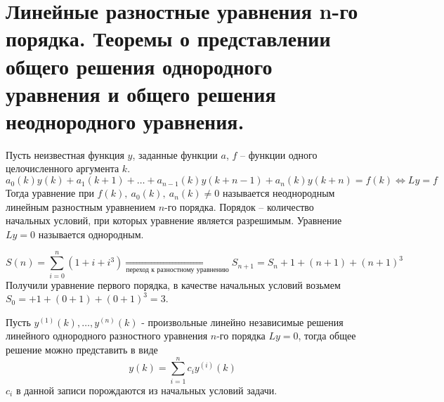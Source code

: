 \section{Линейные разностные уравнения n-го порядка.
  Теоремы о представлении общего решения однородного уравнения
  и общего решения неоднородного уравнения.
 }

\begin{definition}
  Пусть неизвестная функция $y$, заданные функции $a$, $f$
  -- функции одного целочисленного аргумента $k$.
  \[ a_0(k)y(k)+a_1(k+1)+\ldots+a_{n-1}(k)y(k+n-1)+a_n(k)y(k+n)=f(k) \Leftrightarrow Ly=f \]
  Тогда уравнение при $f(k),\ a_0(k),\ a_n(k) \neq 0$ называется
  неоднородным линейным разностным уравнением $n$-го порядка.
  Порядок -- количество начальных условий, при которых уравнение
  является разрешимым. Уравнение $Ly = 0$ называется однородным.
\end{definition}
\begin{example}
  \[S(n)=\sum_{i=0}^{n}(1+i+i^3)\underset{\text{переход к разностному уравнению}}{\Rightarrow}S_{n+1}=S_n+1+(n+1)+(n+1)^3\]
  Получили уравнение первого порядка, в качестве начальных условий возьмем $S_0=+1+(0+1)+(0+1)^3=3$.
\end{example}
\begin{theorem}
  Пусть $y^{(1)}(k),\ldots,y^{(n)}(k)$ - произвольные линейно независимые
  решения линейного однородного разностного уравнения $n$-го порядка
  $Ly=0$, тогда общее решение можно представить в виде
  \[y(k)=\sum_{i=1}^{n}c_iy^{(i)}(k)\]
  $c_i$ в данной записи порождаются из начальных условий задачи.
\end{theorem}
